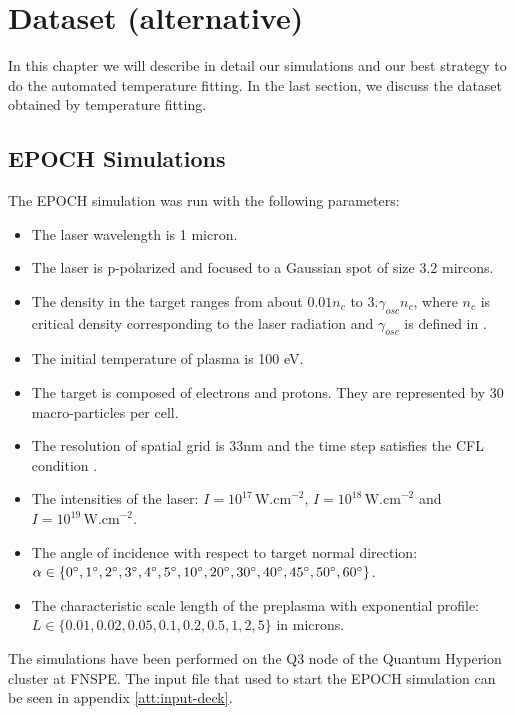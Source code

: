 \chapter{Dataset (alternative)}
\label{ch:dataset-alternative}
In this chapter we will describe in detail our simulations and our best strategy to do the automated temperature fitting. In the last section, we discuss the dataset obtained by temperature fitting.
\section{EPOCH Simulations}
The EPOCH simulation was run with the following parameters:
\begin{itemize}
	\item The laser wavelength is 1 micron.
	\item The laser is p-polarized and focused to a Gaussian spot of size $3.2$ mircons.
	\item The density in the target ranges from about $0.01n_c$ to $3.\gamma_{osc}n_c$, where $n_c$ is critical density corresponding to the laser radiation \cite{cui2013} and $\gamma_{osc}$ is defined in \cite{cui2013}.
	\item The initial temperature of plasma is 100 eV.
	\item The target is composed of electrons and protons. They are represented by 30 macro-particles per cell.
	\item The resolution of spatial grid is 33nm and the time step satisfies the CFL condition \cite{arber2015}.
	\item The intensities of the laser: $I=10^{17}\,\mathrm{W.cm}^{-2}$, $I=10^{18} \,\mathrm{W.cm}^{-2}$ and \newline$I=10^{19}\,\mathrm{W.cm}^{-2}$.
	\item The angle of incidence with respect to target normal direction: \newline $\alpha \in \{0\degree,1\degree,2\degree,3\degree,4\degree,5\degree,10\degree,20\degree,30\degree,40\degree,45\degree,50\degree,60\degree\}$.
	\item The characteristic scale length of the preplasma with exponential profile: \newline $L\in\{0.01,0.02,0.05,0.1,0.2,0.5,1,2,5\}$ in microns.
	
\end{itemize}
The simulations have been performed on the Q3 node of the Quantum Hyperion cluster at FNSPE. The input file that used to start the EPOCH simulation can be seen in appendix \ref{att:input-deck}.

